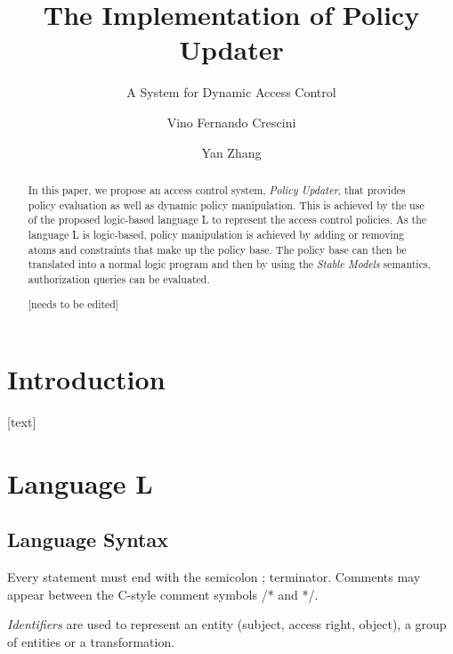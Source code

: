 \documentclass{llncs}
\begin{document}
  \long{}

  \title{The Implementation of Policy Updater}
  \subtitle{A System for Dynamic Access Control}

  \author{Vino Fernando Crescini \and Yan Zhang}


  \maketitle

  \begin{abstract}
    In this paper, we propose an access control system, \emph{Policy Updater},
    that provides policy evaluation as well as dynamic policy manipulation.
    This is achieved by the use of the proposed logic-based language L to
    represent the access control policies. As the language L is logic-based,
    policy manipulation is achieved by adding or removing atoms and constraints
    that make up the policy base. The policy base can then be translated into a
    normal logic program and then by using the \emph{Stable Models} semantics,
    authorization queries can be evaluated.

    [needs to be edited]
  \end{abstract}

  \section{Introduction}
    [text]

  \section{Language L}
    \subsection{Language Syntax}

      Every statement must end with the semicolon ; terminator. Comments
      may appear between the C-style comment symbols /* and */.

      \emph{Identifiers} are used to represent an entity (subject, access
      right, object), a group of entities or a transformation.
\end{document}
